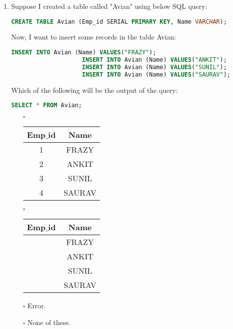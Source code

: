 \documentclass[10pt]{article}
\newcommand{\lightrule}{%
	\arrayrulecolor{black!30}%
	\midrule[\lightrulewidth]%
	\arrayrulecolor{black}}
\begin{document}
\begin{enumerate}
			\item Suppose I created a table called "Avian" using below SQL query: 
				\begin{lstlisting}[language=SQL,firstline=1, lastline=1] 
					CREATE TABLE Avian (Emp_id SERIAL PRIMARY KEY, Name VARCHAR);
				\end{lstlisting}
				Now, I want to insert some records in the table Avian:
				\begin{lstlisting}[language=SQL,firstline=1, lastline=4] 
					INSERT INTO Avian (Name) VALUES("FRAZY");
					INSERT INTO Avian (Name) VALUES("ANKIT");
					INSERT INTO Avian (Name) VALUES("SUNIL");
					INSERT INTO Avian (Name) VALUES("SAURAV");
				\end{lstlisting}
				Which of the following will be the output of the query:
				\begin{lstlisting}[language=SQL,firstline=1, lastline=1] 
					SELECT * FROM Avian;
				\end{lstlisting}

				\begin{enumerate}
					\item[$\square$]
						\begin{tabular}{@{} *{2}{c} @{}}
							\toprule
								\textbf{Emp$\_$id} & \textbf{Name} \\
							\midrule
								1 & FRAZY \\
							\lightrule
								2 & ANKIT \\
							\lightrule
								3 & SUNIL \\
							\lightrule
								4 & SAURAV \\
							\bottomrule
						\end{tabular}

					\item[$\square$]
						\begin{tabular}{@{} *{2}{c} @{}}
							\toprule
								\textbf{Emp$\_$id} & \textbf{Name} \\
							\midrule
								& FRAZY \\
							\lightrule
								& ANKIT \\
							\lightrule
								& SUNIL \\
							\lightrule
								& SAURAV \\
							\bottomrule
						\end{tabular}

					\item[$\square$] Error.
					\item[$\square$] None of these.
				\end{enumerate}
		\end{enumerate}
\end{document}
